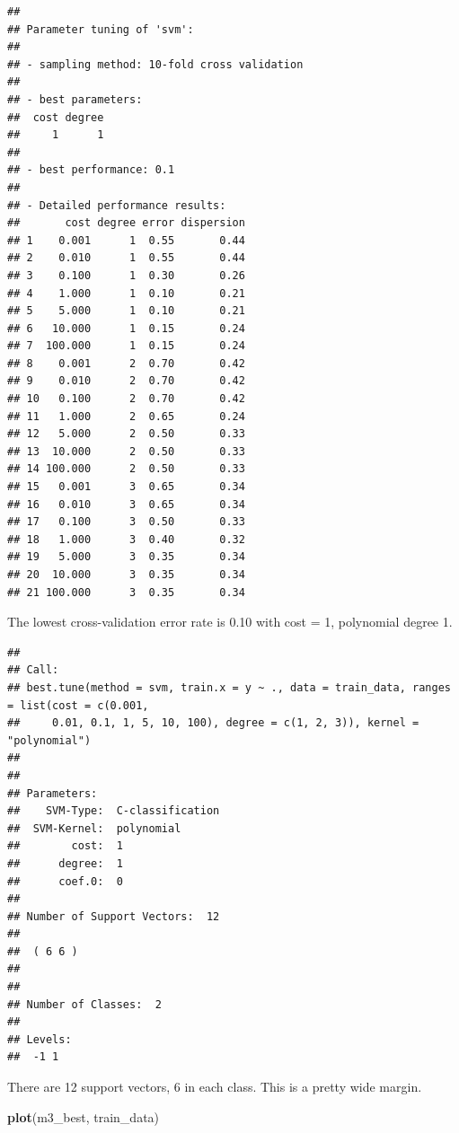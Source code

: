 \documentclass[
]{book}
\newenvironment{Shaded}{\begin{snugshade}}{\end{snugshade}}
\newcommand{\KeywordTok}[1]{\textcolor[rgb]{0.13,0.29,0.53}{\textbf{#1}}}
\newcommand{\NormalTok}[1]{#1}
\newcommand{\OperatorTok}[1]{\textcolor[rgb]{0.81,0.36,0.00}{\textbf{#1}}}
\newcommand{\StringTok}[1]{\textcolor[rgb]{0.31,0.60,0.02}{#1}}
\begin{document}
\begin{verbatim}
## 
## Parameter tuning of 'svm':
## 
## - sampling method: 10-fold cross validation 
## 
## - best parameters:
##  cost degree
##     1      1
## 
## - best performance: 0.1 
## 
## - Detailed performance results:
##       cost degree error dispersion
## 1    0.001      1  0.55       0.44
## 2    0.010      1  0.55       0.44
## 3    0.100      1  0.30       0.26
## 4    1.000      1  0.10       0.21
## 5    5.000      1  0.10       0.21
## 6   10.000      1  0.15       0.24
## 7  100.000      1  0.15       0.24
## 8    0.001      2  0.70       0.42
## 9    0.010      2  0.70       0.42
## 10   0.100      2  0.70       0.42
## 11   1.000      2  0.65       0.24
## 12   5.000      2  0.50       0.33
## 13  10.000      2  0.50       0.33
## 14 100.000      2  0.50       0.33
## 15   0.001      3  0.65       0.34
## 16   0.010      3  0.65       0.34
## 17   0.100      3  0.50       0.33
## 18   1.000      3  0.40       0.32
## 19   5.000      3  0.35       0.34
## 20  10.000      3  0.35       0.34
## 21 100.000      3  0.35       0.34
\end{verbatim}

The lowest cross-validation error rate is 0.10 with cost = 1, polynomial degree 1.

\begin{Shaded}
\end{Shaded}

\begin{verbatim}
## 
## Call:
## best.tune(method = svm, train.x = y ~ ., data = train_data, ranges = list(cost = c(0.001, 
##     0.01, 0.1, 1, 5, 10, 100), degree = c(1, 2, 3)), kernel = "polynomial")
## 
## 
## Parameters:
##    SVM-Type:  C-classification 
##  SVM-Kernel:  polynomial 
##        cost:  1 
##      degree:  1 
##      coef.0:  0 
## 
## Number of Support Vectors:  12
## 
##  ( 6 6 )
## 
## 
## Number of Classes:  2 
## 
## Levels: 
##  -1 1
\end{verbatim}

There are 12 support vectors, 6 in each class. This is a pretty wide margin.

\begin{Shaded}
\begin{Highlighting}[]
\KeywordTok{plot}\NormalTok{(m3_best, train_data)}
\end{Highlighting}
\end{Shaded}
\end{document}
